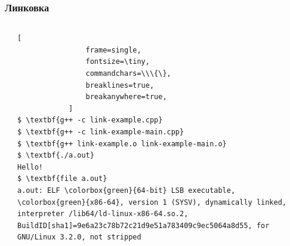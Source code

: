 \documentclass[compress]{beamer}
\begin{document}
\begin{frame}[fragile]

    \frametitle{Линковка}

    \begin{columns}[T]

        \begin{column}{0.4\textwidth}




        \end{column}

        \begin{column}{0.6\textwidth}

            \begin{Verbatim}[
                frame=single,
                fontsize=\tiny,
                commandchars=\\\{\},
                breaklines=true,
                breakanywhere=true,
            ]
$ \textbf{g++ -c link-example.cpp}
$ \textbf{g++ -c link-example-main.cpp}
$ \textbf{g++ link-example.o link-example-main.o}
$ \textbf{./a.out}
Hello!
$ \textbf{file a.out}
a.out: ELF \colorbox{green}{64-bit} LSB executable, \colorbox{green}{x86-64}, version 1 (SYSV), dynamically linked, interpreter /lib64/ld-linux-x86-64.so.2, BuildID[sha1]=9e6a23c78b72c21d9e51a783409c9ec5064a8d55, for GNU/Linux 3.2.0, not stripped
            \end{Verbatim}

        \end{column}

    \end{columns}

\end{frame}
\end{document}

